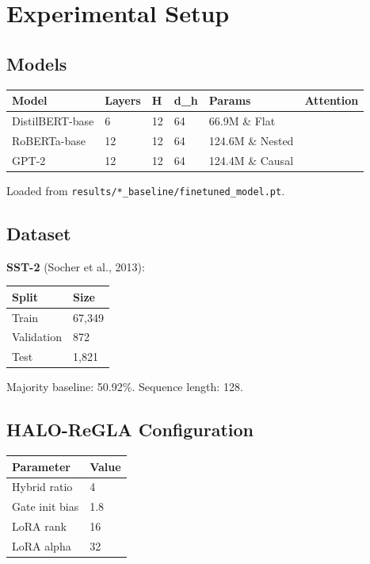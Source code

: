 \section{Experimental Setup}

\subsection{Models}

\begin{table}[H]
\centering
\small
\begin{tabular}{llllll}
\toprule
\textbf{Model} & \textbf{Layers} & \textbf{H} & \textbf{d\_h} & \textbf{Params} & \textbf{Attention} \\
\midrule
DistilBERT-base & 6 & 12 & 64 & 66.9M \& Flat \\
RoBERTa-base & 12 & 12 & 64 & 124.6M \& Nested \\
GPT-2 & 12 & 12 & 64 & 124.4M \& Causal \\
\bottomrule
\end{tabular}
\end{table}

Loaded from \texttt{results/*\_baseline/finetuned\_model.pt}.

\subsection{Dataset}

\textbf{SST-2} (Socher et al., 2013):

\begin{table}[H]
\centering
\small
\begin{tabular}{ll}
\toprule
\textbf{Split} & \textbf{Size} \\
\midrule
Train & 67,349 \\
Validation & 872 \\
Test & 1,821 \\
\bottomrule
\end{tabular}
\end{table}

Majority baseline: 50.92\%. Sequence length: 128.

\subsection{HALO-ReGLA Configuration}

\begin{table}[H]
\centering
\small
\begin{tabular}{ll}
\toprule
\textbf{Parameter} & \textbf{Value} \\
\midrule
Hybrid ratio & 4 \\
Gate init bias & 1.8 \\
LoRA rank & 16 \\
LoRA alpha & 32 \\
\bottomrule
\end{tabular}
\end{table}

